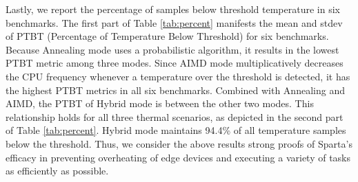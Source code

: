 Lastly, we report the percentage of samples below threshold temperature in six benchmarks. The first part of Table \ref{tab:percent} manifests the mean and stdev of PTBT (Percentage of Temperature Below Threshold) for six benchmarks. Because Annealing mode uses a probabilistic algorithm, it results in the lowest PTBT metric among three modes. Since AIMD mode multiplicatively decreases the CPU frequency whenever a temperature over the threshold is detected, it has the highest PTBT metrics in all six benchmarks. Combined with Annealing and AIMD, the PTBT of Hybrid mode is between the other two modes. This relationship holds for all three thermal scenarios, as depicted in the second part of Table \ref{tab:percent}. Hybrid mode maintains 94.4\% of all temperature samples below the threshold. Thus, we consider the above results strong proofs of Sparta's efficacy in preventing overheating of edge devices and executing a variety of tasks as efficiently as possible.





